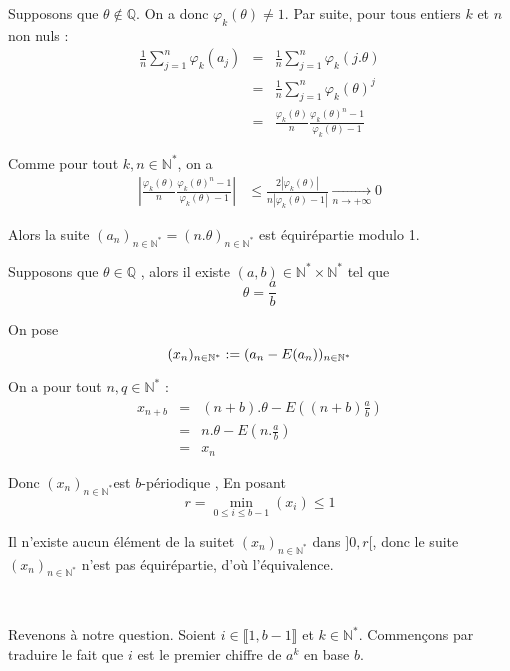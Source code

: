 Supposons que $\theta \nin \mathbb{Q}$. On a donc $\varphi_k (\theta) \neq 1$.
Par suite, pour tous entiers $k$ et $n$ non nuls :
\begin{eqnarray*}
  \frac{1}{n}  \sum_{j = 1}^n \varphi_k (a_j) & = & \frac{1}{n}  \sum_{j =
  1}^n \varphi_k (j. \theta)\\
  & = & \frac{1}{n}  \sum_{j = 1}^n \varphi_k (\theta)^j \\
  & = & \frac{\varphi_k (\theta)}{n}  \frac{\varphi_k (\theta)^n -
  1}{\varphi_k (\theta) - 1}
\end{eqnarray*}


Comme pour tout $k, n \in \mathbb{N}^{\ast}$, on a
\[ \begin{array}{ll}
     \left| \frac{\varphi_k (\theta)}{n}  \frac{\varphi_k (\theta)^n -
     1}{\varphi_k (\theta) - 1} \right| & \leq \frac{2| \varphi_k (\theta)
     |}{n| \varphi_k (\theta) - 1|} \xrightarrow[n \to + \infty]{} 0
   \end{array} \]


Alors la suite $(a_n)_{n \in \mathbb{N}^{\ast}} = (n. \theta)_{n \in
\mathbb{N}^{\ast}}$ est {\'e}quir{\'e}partie modulo 1.

Supposons que $\theta \in \mathbb{Q}$ , alors il existe $(a, b) \in
\mathbb{N}^{\ast} \times \mathbb{N}^{\ast}$ tel que
\[ \theta = \frac{a}{b} \]


On pose
\[ (x_n)_{n \in \mathbb{N}^{\ast}} := (a_n - E (a_n))_{n \in
   \mathbb{N}^{\ast}} \]


On a pour tout $n, q \in \mathbb{N}^{\ast}$ :
\begin{eqnarray*}
  x_{n + b} & = & (n + b) . \theta - E ((n + b) \frac{a}{b})\\
  & = & n. \theta - E (n. \frac{a}{b})\\
  & = & x_n
\end{eqnarray*}


Donc $(x_n)_{n \in \mathbb{N}^{\ast}}$est $b$-p{\'e}riodique , En posant
\[ r = \underset{0 \leqslant i \leqslant b - 1}{\min} (x_i) \leq 1 \]


Il n'existe aucun {\'e}l{\'e}ment de la suitet $(x_n)_{n \in
\mathbb{N}^{\ast}}$ dans $] 0, r [$, donc le suite $(x_n)_{n \in
\mathbb{N}^{\ast}}$ n'est pas {\'e}quir{\'e}partie, d'o{\`u}
l'{\'e}quivalence.

\

Revenons {\`a} notre question. Soient $i \in \llbracket 1, b - 1 \rrbracket$
et $k \in \mathbb{N}^{\ast}$. Commen{\c c}ons par traduire le fait que $i$ est
le premier chiffre de $a^k$ en base $b$.

